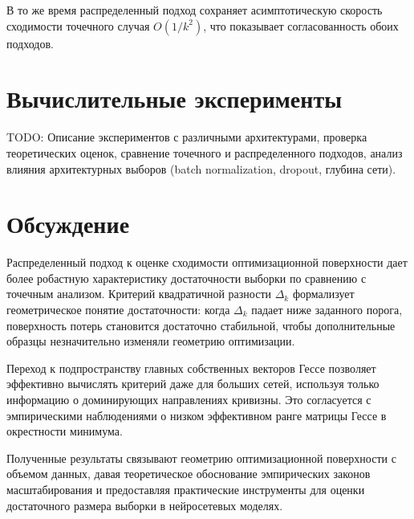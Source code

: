В то же время распределенный подход сохраняет асимптотическую скорость сходимости точечного случая $O(1/k^2)$, что показывает согласованность обоих подходов.

\section{Вычислительные эксперименты}

TODO: Описание экспериментов с различными архитектурами, проверка теоретических оценок, сравнение точечного и распределенного подходов, анализ влияния архитектурных выборов (batch normalization, dropout, глубина сети).

\section{Обсуждение}

Распределенный подход к оценке сходимости оптимизационной поверхности дает более робастную характеристику достаточности выборки по сравнению с точечным анализом. Критерий квадратичной разности $\Delta_k$ формализует геометрическое понятие достаточности: когда $\Delta_k$ падает ниже заданного порога, поверхность потерь становится достаточно стабильной, чтобы дополнительные образцы незначительно изменяли геометрию оптимизации.

Переход к подпространству главных собственных векторов Гессе позволяет эффективно вычислять критерий даже для больших сетей, используя только информацию о доминирующих направлениях кривизны. Это согласуется с эмпирическими наблюдениями о низком эффективном ранге матрицы Гессе в окрестности минимума.

Полученные результаты связывают геометрию оптимизационной поверхности с объемом данных, давая теоретическое обоснование эмпирических законов масштабирования и предоставляя практические инструменты для оценки достаточного размера выборки в нейросетевых моделях.
